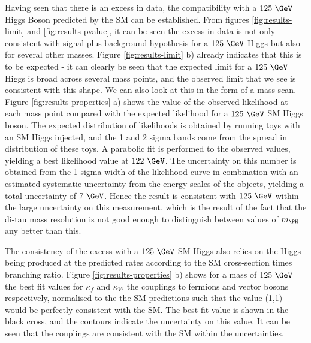Having seen that there is an excess in data, the compatibility with a $125~\GeV$
Higgs Boson predicted by the \ac{SM} can be established. From figures
\ref{fig:results-limit} and \ref{fig:results-pvalue}, it can be seen the excess
in data is not only consistent with signal plus background hypothesis for a
$125~\GeV$ Higgs but also for several other masses. Figure
\ref{fig:results-limit} b) already indicates that this is to be expected - it
can clearly be seen that the expected limit for a $125~\GeV$ Higgs is broad
across several mass points, and the observed limit that we see is consistent
with this shape. We can also look at this in the form of a mass scan. Figure
\ref{fig:results-properties} a) shows the value of the observed likelihood at
each mass point compared with the expected likelihood for a $125~\GeV$ \ac{SM}
Higgs boson. The expected distribution of likelihoods is obtained by running
toys with an \ac{SM} Higgs injected, and the 1 and 2 sigma bands come from the
spread in distribution of these toys. A parabolic fit is performed to the
observed values, yielding a best likelihood value at $122~\GeV$. The uncertainty
on this number is obtained from the 1 sigma width of the likelihood curve in
combination with an estimated systematic uncertainty from the energy scales of
the objects, yielding a total uncertainty of $7~\GeV$. Hence the result is
consistent with $125~\GeV$ within the large uncertainty on this measurement,
which is the result of the fact that the di-tau mass resolution is not good
enough to distinguish between values of $m_{\PH}$ any better than this.

The consistency of the excess with a $125~\GeV$ \ac{SM} Higgs also relies on the
Higgs being produced at the predicted rates according to the \ac{SM}
cross-section times branching ratio. Figure \ref{fig:results-properties} b) shows
for a mass of $125~\GeV$ the  best fit values for $\kappa_{f}$ and $\kappa_{V}$,
the couplings to fermions and vector bosons respectively, normalised to the the
\ac{SM} predictions such that the value (1,1) would be perfectly consistent with
the \ac{SM}. The best fit value is shown in the black cross, and the contours
indicate the uncertainty on this value. It can be seen that the couplings are
consistent with the \ac{SM} within the uncertainties.

